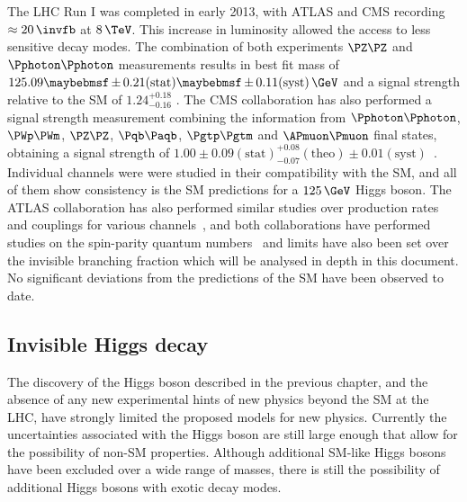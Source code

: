 The \gls{LHC} Run I was completed in early 2013, with ATLAS and \gls{CMS} recording $\approx20\,\invfb$ at $8\,\TeV$. This increase in luminosity allowed the access to less sensitive decay modes. The combination of both experiments $\PZ\PZ$ and $\Pphoton\Pphoton$ measurements results in best fit mass of $125.09 \pm 0.21(\text{stat}) \pm 0.11(\text{syst})\,\GeV$ and a signal strength relative to the \gls{SM} of $1.24^{+0.18}_{-0.16}$ \cite{ARTICLE:CombinedMeasurementOfTheHiggsBoson}. The \gls{CMS} collaboration has also performed a signal strength measurement combining the information from $\Pphoton\Pphoton$, $\PWp\PWm$, $\PZ\PZ$, $\Pqb\Paqb$, $\Pgtp\Pgtm$ and $\APmuon\Pmuon$ final states, obtaining a signal strength of $1.00\pm0.09(\text{stat})^{+0.08}_{-0.07}(\text{theo})\pm0.01(\text{syst})$~\cite{ARTICLE:CMScomb}. Individual channels were were studied in their compatibility with the \gls{SM}, and all of them show consistency is the \gls{SM} predictions for a $125\,\GeV$ Higgs boson. The ATLAS collaboration has also performed similar studies over production rates and couplings for various channels~\cite{Aad:2014eva,Aad:2014lwa,Aad:2015vsa}, and both collaborations have performed studies on the spin-parity quantum numbers~\cite{Chatrchyan:2013mxa,Chatrchyan:2013iaa,Aad:2013xqa} and limits have also been set over the invisible branching fraction which will be analysed in depth in this document. No significant deviations from the predictions of the \gls{SM} have been observed to date.

\subsection{Invisible Higgs decay}
\label{SUBSECTION:Theory_SM_InvisibleHiggsDecay}


The discovery of the Higgs boson described in the previous chapter, and the absence of any new experimental hints of new physics beyond the \gls{SM} at the \gls{LHC}, have strongly limited the proposed models for new physics. Currently the uncertainties associated with the Higgs boson are still large enough that allow for the possibility of non-\gls{SM} properties. Although additional \gls{SM}-like Higgs bosons have been excluded over a wide range of masses, there is still the possibility of additional Higgs bosons with exotic decay modes.

